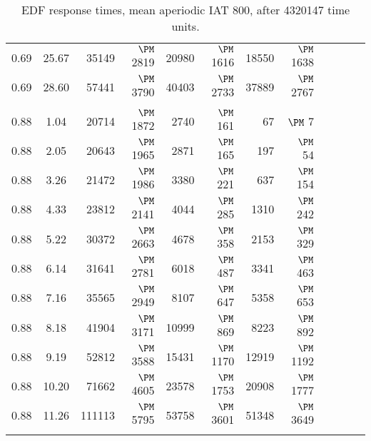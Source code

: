 \begin{table}
\begin{center}
\begin{tabular}{ccr@{}rr@{}rr@{}rr@{}rr@{}r}
0.69 & 25.67 & 35149 & $\PM$ 2819 & 20980 & $\PM$ 1616 & 18550 & $\PM$ 1638\\
0.69 & 28.60 & 57441 & $\PM$ 3790 & 40403 & $\PM$ 2733 & 37889 & $\PM$ 2767\\
\\
0.88 & 1.04 & 20714 & $\PM$ 1872 &  2740 & $\PM$ 161 &    67 & $\PM$   7\\
0.88 & 2.05 & 20643 & $\PM$ 1965 &  2871 & $\PM$ 165 &   197 & $\PM$  54\\
0.88 & 3.26 & 21472 & $\PM$ 1986 &  3380 & $\PM$ 221 &   637 & $\PM$ 154\\
0.88 & 4.33 & 23812 & $\PM$ 2141 &  4044 & $\PM$ 285 &  1310 & $\PM$ 242\\
0.88 & 5.22 & 30372 & $\PM$ 2663 &  4678 & $\PM$ 358 &  2153 & $\PM$ 329\\
0.88 & 6.14 & 31641 & $\PM$ 2781 &  6018 & $\PM$ 487 &  3341 & $\PM$ 463\\
0.88 & 7.16 & 35565 & $\PM$ 2949 &  8107 & $\PM$ 647 &  5358 & $\PM$ 653\\
0.88 & 8.18 & 41904 & $\PM$ 3171 & 10999 & $\PM$ 869 &  8223 & $\PM$ 892\\
0.88 & 9.19 & 52812 & $\PM$ 3588 & 15431 & $\PM$ 1170 & 12919 & $\PM$ 1192\\
0.88 & 10.20 & 71662 & $\PM$ 4605 & 23578 & $\PM$ 1753 & 20908 & $\PM$ 1777\\
0.88 & 11.26 & 111113 & $\PM$ 5795 & 53758 & $\PM$ 3601 & 51348 & $\PM$ 3649\\
\\
\end{tabular}\end{center}\caption{EDF response times, mean aperiodic IAT 800, after 4320147 time units.}
\label{tab:C}\end{table}
